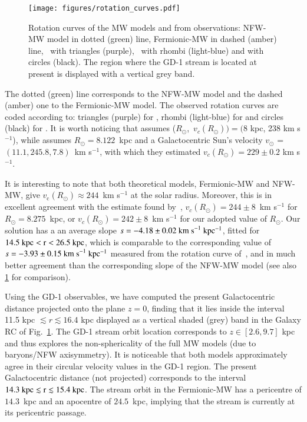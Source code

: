 \documentclass[twocolumn]{aa}
\begin{document}
\begin{figure}
   \centering
   \texttt{[image: figures/rotation\_curves.pdf]}
   \caption{Rotation curves of the MW models and from observations: NFW-MW model in dotted (green) line, Fermionic-MW in dashed (amber) line,~\citet{Eilers_2019} with triangles (purple),~\citet{sofue_2020} with rhombi (light-blue) and \citet{Jiao2023} with circles (black). The region where the GD-1 stream is located at present is displayed with a vertical grey band.}
   \label{fig:rotcurve}
\end{figure}

The dotted (green) line corresponds to the NFW-MW model and the dashed (amber) one to the Fermionic-MW model.
The observed rotation curves are coded according to: triangles (purple)
for \citet{Eilers_2019}, rhombi (light-blue) for \citet{sofue_2020} and
circles (black) for \citet{Jiao2023}. It is worth noticing  that \citet{sofue_2020} assumes
($R_\odot$,~$v_c(R_\odot))=(8$ kpc, 238 km s$^{-1}$), while \citet{Eilers_2019}
assumes $R_\odot=8.122$~kpc and a Galactocentric Sun's velocity $v_\odot$ = $(11.1, 245.8, 7.8)$~km s$^{-1}$,
with which they estimated $v_c(R_\odot)=229\pm0.2$ km s$^{-1}$.

It is interesting to note that both theoretical models, Fermionic-MW and NFW-MW, give $v_\mathrm{c}(R_\odot)\approx 244$~km s$^{-1}$ 
at the solar radius.
Moreover, this is in excellent agreement with the estimate found
by~\citet{2020arXiv201202169B}, $v_c(R_\odot)=244\pm 8$~km s$^{-1}$ for $R_\odot = 8.275$~kpc, or $v_c(R_\odot)=242\pm 8$~km s$^{-1}$ for our adopted value of $R_\odot$.
Our solution has a an average slope $s=-4.18\pm0.02~\rm{km~s}^{-1}~kpc^{-1}$, fitted for $14.5~\rm{kpc} < r < 26.5~\rm{kpc}$, which is 
comparable to the corresponding value of $s=-3.93\pm0.15~\rm{km~s}^{-1}~kpc^{-1}$ measured from the rotation curve of~\citet{Jiao2023}, and in much better agreement than the corresponding slope of the NFW-MW model (see also \cref{fig:rotcurve} for comparison).

Using the GD-1 observables, we have computed the present Galactocentric distance projected onto the plane $z=0$, finding that it lies inside the interval 11.5 kpc $\lesssim r \lesssim 16.4$ kpc displayed as a vertical shaded (grey) band in the Galaxy RC of Fig.~\ref{fig:rotcurve}. The GD-1 stream orbit location corresponds to $z\in [2.6, 9.7]$ kpc and thus explores the non-sphericality of the full MW models (due to baryons/NFW axisymmetry).
It is noticeable that both models approximately agree in their circular velocity values in the GD-1 region. 
The present Galactocentric distance (not projected) corresponds to the interval $14.3~\rm{kpc} \lesssim r \lesssim 15.4~\rm{kpc}$. The stream orbit in the Fermionic-MW has a pericentre of $14.3$~kpc and an apocentre
of $24.5$~kpc, implying that the stream is currently at its pericentric passage.
\end{document}

